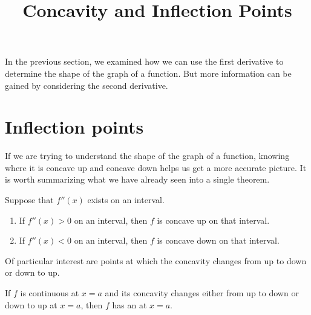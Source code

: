 \documentclass{ximera}
\title{Concavity and Inflection Points}
\begin{document}
\maketitle
In the previous section, we examined how we can use the first derivative to determine the shape of the graph of a function. But more information can be gained by considering the second derivative. 

\section{Inflection points}


If we are trying to understand the shape of the graph of a function,
knowing where it is concave up and concave down helps us  get a more
accurate picture. It is worth summarizing what we have already seen into
 a single theorem.

\begin{theorem}
Suppose that $f''(x)$ exists on an interval.
\begin{enumerate}
\item If $f''(x)>0$ on an interval, then $f$ is concave up on that interval.
\item If $f''(x)<0$ on an interval, then $f$ is concave down on that interval.
\end{enumerate}
\end{theorem}


Of particular interest are points at which the concavity changes from
up to down or down to up. 

\begin{definition}
If $f$ is continuous at $x=a$ and its concavity changes either from up to down
or down to up at $x=a$, then $f$ has an  at
$x=a$.
\end{definition}
\end{document}

